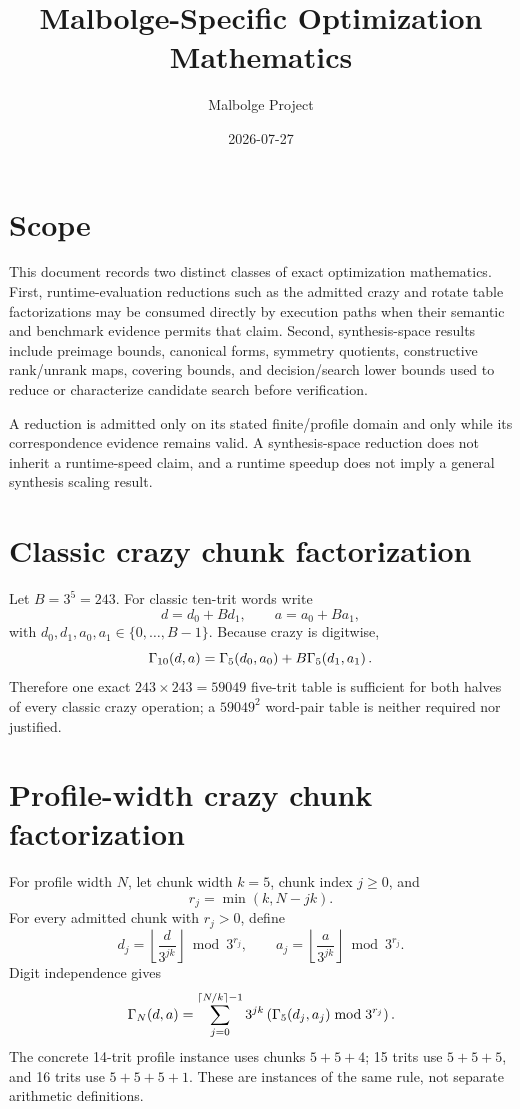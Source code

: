 \documentclass{article}
\title{Malbolge-Specific Optimization Mathematics}
\author{Malbolge Project}
\date{2026{-}07{-}27}
\begin{document}
\maketitle

\section{Scope}

This document records two distinct classes of exact optimization mathematics.
First, runtime-evaluation reductions such as the admitted crazy and rotate table
factorizations may be consumed directly by execution paths when their semantic
and benchmark evidence permits that claim. Second, synthesis-space results
include preimage bounds, canonical forms, symmetry quotients, constructive
rank/unrank maps, covering bounds, and decision/search lower bounds used to
reduce or characterize candidate search before verification.

A reduction is admitted only on its stated finite/profile domain and only while
its correspondence evidence remains valid. A synthesis-space reduction does not
inherit a runtime-speed claim, and a runtime speedup does not imply a general
synthesis scaling result.

\section{Classic crazy chunk factorization}

Let $B=3^5=243$. For classic ten-trit words write
\[
  d=d_0+B d_1,\qquad a=a_0+B a_1,
\]
with $d_0,d_1,a_0,a_1\in\{0,\ldots,B-1\}$. Because crazy is digitwise,
\begin{equation}
  \Gamma_{10}\!\left(d,a\right)
    = \Gamma_{5}\!\left(d_0,a_0\right)
      + B\Gamma_{5}\!\left(d_1,a_1\right).
  \label{eq:optimization-crazy-chunk}
\end{equation}
Therefore one exact $243\times243=59049$ five-trit table is sufficient for both
halves of every classic crazy operation; a $59049^2$ word-pair table is neither
required nor justified.

\section{Profile-width crazy chunk factorization}

For profile width $N$, let chunk width $k=5$, chunk index $j\geq0$, and
\[
  r_j=\min(k,N-jk).
\]
For every admitted chunk with $r_j>0$, define
\[
  d_j=\left\lfloor\frac{d}{3^{jk}}\right\rfloor\bmod3^{r_j},
  \qquad
  a_j=\left\lfloor\frac{a}{3^{jk}}\right\rfloor\bmod3^{r_j}.
\]
Digit independence gives
\begin{equation}
  \Gamma_{N}\!\left(d,a\right)
    = \sum_{j=0}^{\lceil N/k\rceil-1}
      3^{jk}\left(\Gamma_{5}\!\left(d_j,a_j\right)\bmod3^{r_j}\right).
  \label{eq:optimization-crazy-profile-chunks}
\end{equation}
The concrete 14-trit profile instance uses chunks $5+5+4$; 15 trits use
$5+5+5$, and 16 trits use $5+5+5+1$. These are instances of the same rule, not
separate arithmetic definitions.
\end{document}
